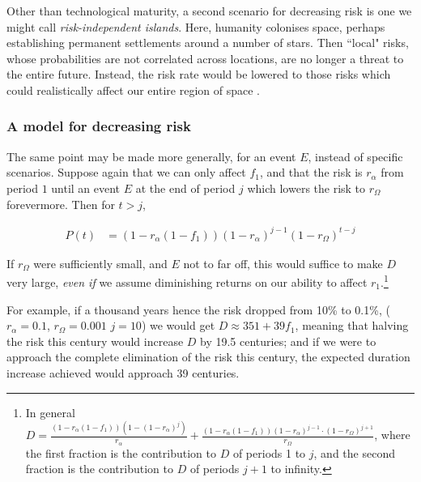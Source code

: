 \documentclass[british]{article}
\begin{document}
Other than technological maturity, a second scenario for decreasing risk is one we might call \emph{risk-independent islands}. Here,
humanity colonises space, perhaps establishing permanent settlements
around a number of stars. Then ``local" risks, whose probabilities are
not correlated across locations, are no longer a threat to the entire
future. Instead, the risk rate would be lowered to
those risks which could realistically affect our entire region of
space \citep{ord_modelling_2014}.

\subsubsection{A model for decreasing risk} The same point may be made more generally, for an event $E$, instead of specific scenarios. Suppose again that we can only affect $f_1$, and that the risk is $r_\alpha$ from period $1$ until an event \(E\) at the end of period \(j\) which lowers the risk to $r_\Omega$ forevermore. Then for $t>j$,


\begin{align}
P(t) &= (1-r_\alpha(1-f_1)) (1-r_\alpha)^{j-1} (1-r_\Omega)^{t-j} \label{eq:vr}
\end{align}

If $r_\Omega$ were sufficiently small, and $E$ not to far off, this would suffice to make $D$ very large, \emph{even if} we assume diminishing returns on our ability to affect $r_1$.\footnote{In general $D=  \frac{(1-r_\alpha(1-f_1)) (1-(1 - r_\alpha)^j)}{r_\alpha} + \frac{(1-r_\alpha(1-f_1)) (1-r_\alpha)^{j-1} \cdot (1-r_\Omega)^{j+1}}{r_\Omega}$, where the first fraction is the contribution to $D$ of periods 1 to $j$, and the second fraction is the contribution to $D$ of periods $j+1$ to infinity.} 

For example, if a thousand years hence the risk dropped from 10\% to 0.1\%, ($r_\alpha=0.1$, $r_\Omega=0.001$ $j=10$) we would get $D\approx 351+ 39f_1$, meaning that halving the risk this century would increase $D$ by 19.5 centuries; and if we were to approach the complete elimination of the risk this century, the expected duration increase achieved would approach 39 centuries.
\end{document}
